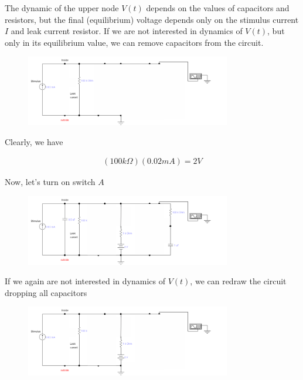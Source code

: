 \documentclass[12]{book}
\newcommand\0{\mathbf{0}}
\newcommand\<{\langle}
\renewcommand\>{\rangle}
\begin{document}
The dynamic of the upper node $V(t)$ depends on the values of capacitors and resistors, but the final (equilibrium) voltage depends only on the stimulus current $I$ and leak current resistor. If we are not interested in dynamics of $V(t)$, but only in its equilibrium value, we can remove capacitors from the circuit.
 
\begin{figure}[H]
\centering
\includegraphics[width=0.8\textwidth]{exercise1-2}
\end{figure}

Clearly, we have

\begin{align*}
(100k\Omega)(0.02 mA) = 	2V
\end{align*}


Now, let's turn on switch $A$
 
 \begin{figure}[H]
 \centering
\includegraphics[width=0.8\textwidth]{exercise1-3}
\end{figure}

If we again are not interested in dynamics of $V(t)$, we can redraw the circuit dropping all capacitors
 
 \begin{figure}[H]
 \centering
\includegraphics[width=0.8\textwidth]{exercise1-4}
\end{figure}
\end{document}
